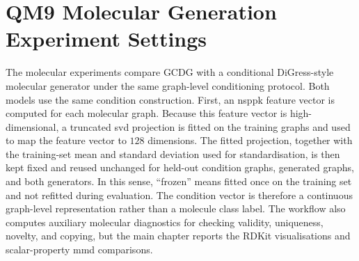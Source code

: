 \clearpage
\section{QM9 Molecular Generation Experiment Settings}
\label{app:qm9-molecular-settings}

The molecular experiments compare GCDG with a conditional DiGress-style
molecular generator under the same
graph-level conditioning protocol. Both models use the same condition
construction. First, an \gls{nsppk} feature vector is computed for each
molecular graph. Because this feature vector is high-dimensional, a truncated
\gls{svd} projection is fitted on the training graphs and used to map the
feature vector to \(128\) dimensions. The fitted projection, together with the
training-set mean and standard deviation used for standardisation, is then kept
fixed and reused unchanged for held-out condition graphs, generated graphs, and
both generators. In this sense, ``frozen'' means fitted once on the training
set and not refitted during evaluation. The condition vector is therefore a
continuous graph-level representation rather than a molecule class label. The
workflow also computes auxiliary molecular diagnostics for checking validity,
uniqueness, novelty, and copying, but the main chapter reports the RDKit
visualisations and scalar-property \gls{mmd} comparisons.

